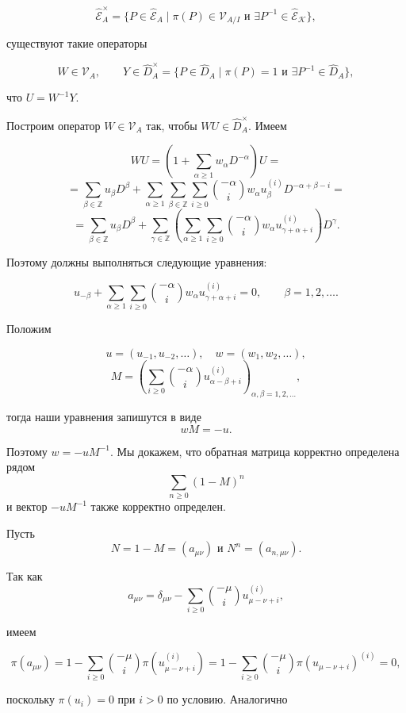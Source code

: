 \documentclass{article}
\theoremstyle{definition}
\theoremstyle{definition} %
\theoremstyle{remark}     %
\theoremstyle{definition}
\theoremstyle{definition}
\theoremstyle{definition}
\theoremstyle{definition}
\theoremstyle{definition}
\theoremstyle{definition}
\theoremstyle{definition}
\theoremstyle{definition}
\begin{document}
\[
\hat{\mathcal{E}}_A^\times = \{ P \in \hat{\mathcal{E}}_A \mid \pi(P) \in \mathcal{V}_{A/I} \text{ и } \exists P^{-1} \in \hat{\mathcal{E}}_\mathcal{K} \},
\]

существуют такие операторы

\[
W \in \mathcal{V}_A, \qquad
Y \in \hat{D}_A^\times = \{ P \in \hat{D}_A \mid \pi(P) = 1 \text{ и } \exists P^{-1} \in \hat{D}_A \},
\]

что \( U = W^{-1}Y \).

Построим оператор \( W \in \mathcal{V}_A \) так, чтобы \( WU \in \hat{D}_A^\times \). Имеем

\[
WU = \left( 1 + \sum_{\alpha \ge 1} w_\alpha D^{-\alpha} \right) U =
\]
\[
= \sum_{\beta \in \mathbb{Z}} u_\beta D^\beta + \sum_{\alpha \ge 1} \sum_{\beta \in \mathbb{Z}} \sum_{i \ge 0} \binom{-\alpha}{i} w_\alpha u_\beta^{(i)} D^{-\alpha + \beta - i} =
\]
\[
= \sum_{\beta \in \mathbb{Z}} u_\beta D^\beta + \sum_{\gamma \in \mathbb{Z}} \left( \sum_{\alpha \ge 1} \sum_{i \ge 0} \binom{-\alpha}{i} w_\alpha u^{(i)}_{\gamma + \alpha + i} \right) D^\gamma.
\]

Поэтому должны выполняться следующие уравнения:

\[
u_{-\beta} + \sum_{\alpha \ge 1} \sum_{i \ge 0} \binom{-\alpha}{i} w_\alpha u^{(i)}_{\gamma + \alpha + i} = 0, \qquad \beta = 1, 2, \dots.
\]

Положим

\[
u = (u_{-1}, u_{-2}, \dots), \quad w = (w_1, w_2, \dots),
\]
\[
M = \left( \sum_{i \ge 0} \binom{-\alpha}{i} u^{(i)}_{\alpha - \beta + i} \right)_{\alpha, \beta = 1, 2, \dots},
\]

тогда наши уравнения запишутся в виде  
\[ wM = -u. \]


Поэтому \( w = -uM^{-1} \). Мы докажем, что обратная матрица корректно определена рядом  
\[
\sum_{n \geq 0} (1 - M)^n
\]
и вектор \(-uM^{-1}\) также корректно определен.

Пусть  
\[
N = 1 - M = (a_{\mu\nu}) \text{ и } N^n = (a_{n,\mu\nu}).
\]

Так как  
\[
a_{\mu\nu} = \delta_{\mu\nu} - \sum_{i \geq 0} \binom{-\mu}{i} u^{(i)}_{\mu-\nu+i},
\]

имеем

\[
\pi(a_{\mu \nu}) = 1 - \sum_{i \geq 0} \binom{-\mu}{i} \pi(u^{(i)}_{\mu-\nu+i}) = 1 - \sum_{i \geq 0} \binom{-\mu}{i} \pi(u_{\mu-\nu+i})^{(i)} = 0,
\]

поскольку \(\pi(u_i) = 0\) при \(i > 0\) по условию. Аналогично
\end{document}
